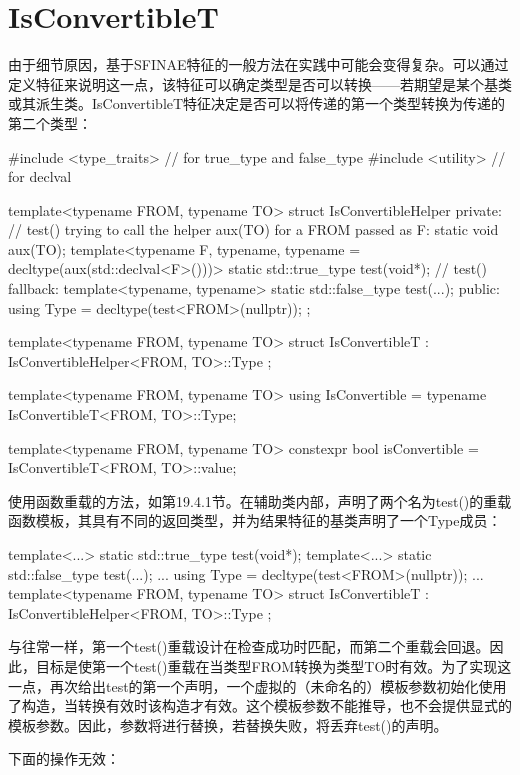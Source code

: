 \section{IsConvertibleT}
由于细节原因，基于SFINAE特征的一般方法在实践中可能会变得复杂。可以通过定义特征来说明这一点，该特征可以确定类型是否可以转换——若期望是某个基类或其派生类。IsConvertibleT特征决定是否可以将传递的第一个类型转换为传递的第二个类型：

\begin{cpp}
#include <type_traits> // for true_type and false_type
#include <utility> // for declval

template<typename FROM, typename TO>
struct IsConvertibleHelper {
	private:
	// test() trying to call the helper aux(TO) for a FROM passed as F:
		static void aux(TO);
	template<typename F, typename,
	typename = decltype(aux(std::declval<F>()))>
		static std::true_type test(void*);
	// test() fallback:
	template<typename, typename>
		static std::false_type test(...);
	public:
	using Type = decltype(test<FROM>(nullptr));
};

template<typename FROM, typename TO>
struct IsConvertibleT : IsConvertibleHelper<FROM, TO>::Type {};

template<typename FROM, typename TO>
using IsConvertible = typename IsConvertibleT<FROM, TO>::Type;

template<typename FROM, typename TO>
constexpr bool isConvertible = IsConvertibleT<FROM, TO>::value;
\end{cpp}

使用函数重载的方法，如第19.4.1节。在辅助类内部，声明了两个名为test()的重载函数模板，其具有不同的返回类型，并为结果特征的基类声明了一个Type成员：

\begin{cpp}
template<...> static std::true_type test(void*);
template<...> static std::false_type test(...);
...
using Type = decltype(test<FROM>(nullptr));
...
template<typename FROM, typename TO>
struct IsConvertibleT : IsConvertibleHelper<FROM, TO>::Type {};
\end{cpp}

与往常一样，第一个test()重载设计在检查成功时匹配，而第二个重载会回退。因此，目标是使第一个test()重载在当类型FROM转换为类型TO时有效。为了实现这一点，再次给出test的第一个声明，一个虚拟的（未命名的）模板参数初始化使用了构造，当转换有效时该构造才有效。这个模板参数不能推导，也不会提供显式的模板参数。因此，参数将进行替换，若替换失败，将丢弃test()的声明。

下面的操作无效：

